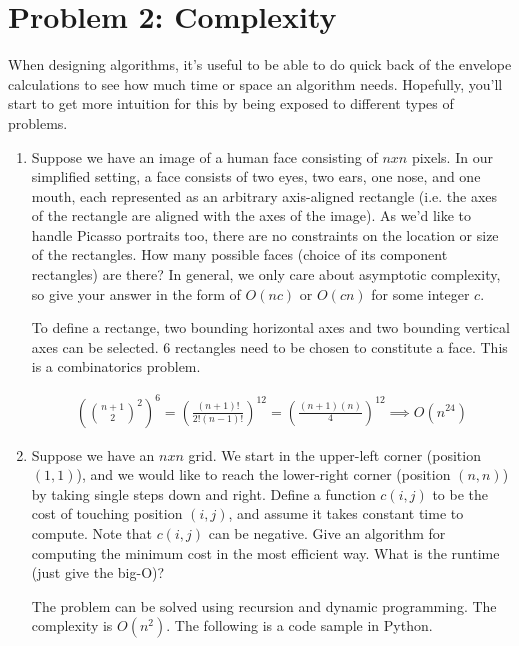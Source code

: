 \documentclass[10pt]{article}
\begin{document}
\section*{\normalsize Problem 2: Complexity}

When designing algorithms, it's useful to be able to do quick back of the envelope calculations to see how much time or space an algorithm needs. Hopefully, you'll start to get more intuition for this by being exposed to different types of problems.

\begin{enumerate}[label=(\alph*)]

  \item Suppose we have an image of a human face consisting of $nxn$ pixels. In our simplified setting, a face consists of two eyes, two ears, one nose, and one mouth, each represented as an arbitrary axis-aligned rectangle (i.e. the axes of the rectangle are aligned with the axes of the image). As we'd like to handle Picasso portraits too, there are no constraints on the location or size of the rectangles. How many possible faces (choice of its component rectangles) are there? In general, we only care about asymptotic complexity, so give your answer in the form of $O(nc)$ or $O(cn)$ for some integer $c$.
  
  To define a rectange, two bounding horizontal axes and two bounding vertical axes can be selected. 6 rectangles need to be chosen to constitute a face. This is a combinatorics problem.
  
  \begin{align*}
  \left(\binom{n + 1}{2}^2\right)^6 = \left(\frac{(n + 1)!}{2!(n - 1)!}\right)^{12} = \left(\frac{(n + 1)(n)}{4}\right)^{12} \implies O(n^{24})
  \end{align*}
  
  \item Suppose we have an $nxn$ grid. We start in the upper-left corner (position $(1,1)$), and we would like to reach the lower-right corner (position $(n,n)$) by taking single steps down and right. Define a function $c(i,j)$ to be the cost of touching position $(i,j)$, and assume it takes constant time to compute. Note that $c(i,j)$ can be negative. Give an algorithm for computing the minimum cost in the most efficient way. What is the runtime (just give the big-O)?
  
  The problem can be solved using recursion and dynamic programming. The complexity is $O(n^2)$. The following is a code sample in Python.
  

\end{enumerate}
\end{document}
